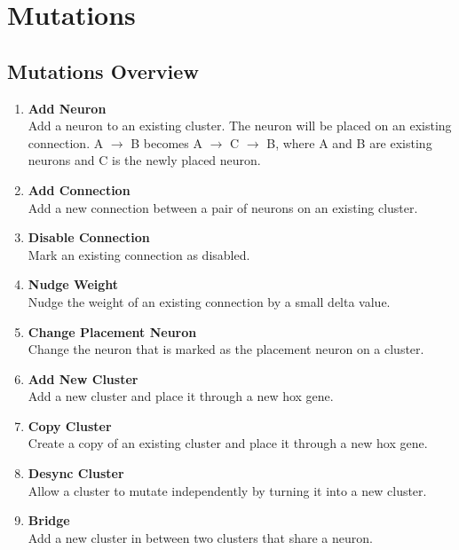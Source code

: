 \newpage
\section{Mutations}

\subsection{Mutations Overview}

\begin{enumerate}\itemsep0pt
    \item \textbf{Add Neuron} \\
    Add a neuron to an existing cluster. The neuron will be placed on an existing connection.  
    A $\rightarrow$ B becomes A $\rightarrow$ C $\rightarrow$ B, where A and B are existing neurons and C is the newly placed neuron.
    
    \item \textbf{Add Connection} \\
    Add a new connection between a pair of neurons on an existing cluster.
    
    \item \textbf{Disable Connection} \\    
    Mark an existing connection as disabled.
    
    \item \textbf{Nudge Weight} \\    
    Nudge the weight of an existing connection by a small delta value.
    
    \item \textbf{Change Placement Neuron} \\    
    Change the neuron that is marked as the placement neuron on a cluster.
    
    \item \textbf{Add New Cluster} \\    
    Add a new cluster and place it through a new hox gene.
    
    \item \textbf{Copy Cluster} \\    
    Create a copy of an existing cluster and place it through a new hox gene.
    
    \item \textbf{Desync Cluster} \\    
    Allow a cluster to mutate independently by turning it into a new cluster.
    
    \item \textbf{Bridge} \\    
    Add a new cluster in between two clusters that share a neuron.
    

\end{enumerate}
